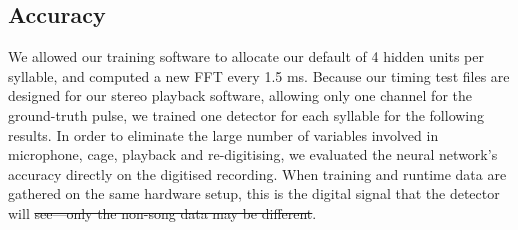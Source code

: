 \documentclass[10pt,letterpaper]{article}
\let\oldmarginpar\marginpar
\renewcommand{\marginpar}[1]{\oldmarginpar{\linespread{1}\scriptsize{#1}}}
\providecommand{\DIFaddtex}[1]{{\protect\color{blue}\uwave{#1}}} %
\providecommand{\DIFdeltex}[1]{{\protect\color{red}\sout{#1}}}                      %
\providecommand{\DIFaddbegin}{} %
\providecommand{\DIFaddend}{} %
\providecommand{\DIFdelbegin}{} %
\providecommand{\DIFdelend}{} %
\providecommand{\DIFadd}[1]{\texorpdfstring{\DIFaddtex{#1}}{#1}} %
\providecommand{\DIFdel}[1]{\texorpdfstring{\DIFdeltex{#1}}{}} %
\begin{document}
\subsection{Accuracy}


We allowed our training software to allocate our default of 4 hidden
units per syllable, and computed a new FFT every 1.5 ms.  Because our
timing test files are designed for our stereo playback software,
allowing only one channel for the ground-truth pulse, we trained one
detector for each syllable for the following results.  In order to
eliminate the large number of variables involved in microphone, cage,
playback and re-digitising, we evaluated the neural network's accuracy
directly on the digitised recording.  When training and runtime data
are gathered on the same hardware setup, this is the digital signal
that the detector will \DIFdelbegin \DIFdel{see---only the non-song data may be different}\DIFdelend \DIFaddbegin \DIFadd{see}\DIFaddend .
\end{document}
